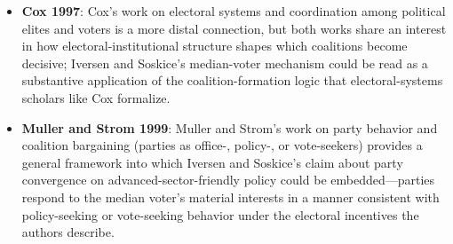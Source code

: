 \documentclass[12pt]{article}
\begin{document}
\begin{itemize}[leftmargin=*, itemsep=4pt]
    \item \textbf{Cox 1997}: Cox's work on electoral systems and coordination among political elites and voters is a more distal connection, but both works share an interest in how electoral-institutional structure shapes which coalitions become decisive; Iversen and Soskice's median-voter mechanism could be read as a substantive application of the coalition-formation logic that electoral-systems scholars like Cox formalize.
    \item \textbf{Muller and Strom 1999}: Muller and Strom's work on party behavior and coalition bargaining (parties as office-, policy-, or vote-seekers) provides a general framework into which Iversen and Soskice's claim about party convergence on advanced-sector-friendly policy could be embedded---parties respond to the median voter's material interests in a manner consistent with policy-seeking or vote-seeking behavior under the electoral incentives the authors describe.
\end{itemize}
\end{document}
